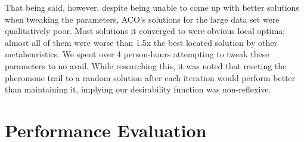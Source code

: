 \documentclass[a4paper]{article}
\begin{document}
That being said, however, despite being unable to come up with better solutions when tweaking the parameters, ACO's solutions for the large data set were qualitatively poor. Most solutions it converged to were obvious local optima; almost all of them were worse than 1.5x the best located solution by other metaheuristics. We spent over 4 person-hours attempting to tweak these parameters to no avail. While researching this, it was noted that reseting the pheromone trail to a random solution after each iteration would perform better than maintaining it, implying our desirability function was non-reflexive.


\section{Performance Evaluation}






\end{document}
